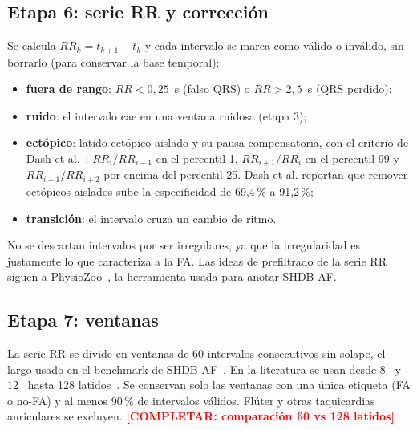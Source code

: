\documentclass[11pt,a4paper]{article}
\newcommand{\completar}[1]{\textcolor{red}{\textbf{[COMPLETAR: #1]}}}
\begin{document}
\subsection{Etapa 6: serie RR y corrección}
Se calcula $RR_k = t_{k+1} - t_k$ y cada intervalo se marca como válido o inválido, sin borrarlo (para conservar la base temporal):
\begin{itemize}
  \item \textbf{fuera de rango}: $RR < 0{,}25$~s (falso QRS) o $RR > 2{,}5$~s (QRS perdido);
  \item \textbf{ruido}: el intervalo cae en una ventana ruidosa (etapa 3);
  \item \textbf{ectópico}: latido ectópico aislado y su pausa compensatoria, con el criterio de Dash et al.~\cite{dash2009}: $RR_i/RR_{i-1}$ en el percentil 1, $RR_{i+1}/RR_i$ en el percentil 99 y $RR_{i+1}/RR_{i+2}$ por encima del percentil 25. Dash et al. reportan que remover ectópicos aislados sube la especificidad de 69,4\,\% a 91,2\,\%;
  \item \textbf{transición}: el intervalo cruza un cambio de ritmo.
\end{itemize}
No se descartan intervalos por ser irregulares, ya que la irregularidad es justamente lo que caracteriza a la FA. Las ideas de prefiltrado de la serie RR siguen a PhysioZoo~\cite{behar2018}, la herramienta usada para anotar SHDB-AF.

\subsection{Etapa 7: ventanas}
La serie RR se divide en ventanas de 60 intervalos consecutivos sin solape, el largo usado en el benchmark de SHDB-AF~\cite{tsutsui2025}. En la literatura se usan desde 8~\cite{petrenas2015} y 12~\cite{lake2011} hasta 128 latidos~\cite{dash2009}. Se conservan solo las ventanas con una única etiqueta (FA o no-FA) y al menos 90\,\% de intervalos válidos. Flúter y otras taquicardias auriculares se excluyen. \completar{comparación 60 vs 128 latidos}
\end{document}
